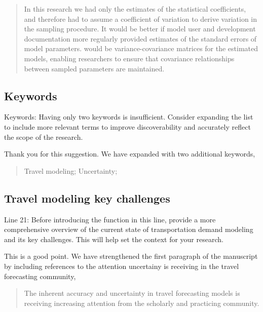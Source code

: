 \documentclass{ar2rc}
\begin{document}
\begin{quote}
In this research we had only the estimates of the statistical
coefficients, and therefore had to assume a coefficient of variation to
derive variation in the sampling procedure. It would be better if model
user and development documentation more regularly provided estimates of
the standard errors of model parameters. \DIFdelbegin {}\DIFdelend \DIFaddbegin {}\DIFaddend would be
variance-covariance matrices for the estimated models, enabling
researchers to ensure that covariance relationships between sampled
parameters are maintained. \DIFaddbegin {}\DIFaddend 
\end{quote}


\subsection{Keywords}
\RC Keywords: Having only two keywords is insufficient. Consider expanding the list to include
more relevant terms to improve discoverability and accurately reflect the scope of the
research.

\AR Thank you for this suggestion. We have expanded with two additional keywords,
\begin{quote}
    Travel modeling; Uncertainty; \DIFaddbegin {}\DIFaddend 
\end{quote}

\subsection{Travel modeling key challenges}
\RC Line 21: Before introducing the function in this line, provide a more comprehensive overview of
the current state of transportation demand modeling and its key challenges. This will help set
the context for your research.

\AR This is a good point. We have strengthened the first paragraph of the
manuscript by including references to the attention uncertainy is receiving in the 
travel forecasting community,

\begin{quote}
    The inherent accuracy and uncertainty in travel forecasting models is
    receiving increasing attention from the scholarly and practicing
    community. \DIFaddbegin {}\DIFaddend 
\end{quote}
\end{document}

